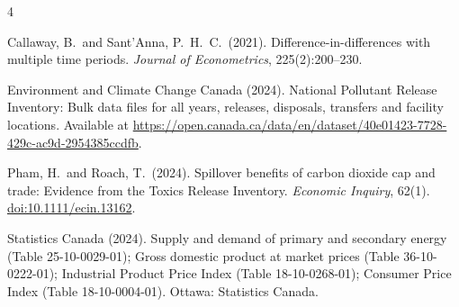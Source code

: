 \documentclass[12pt]{article}
\begin{document}

\begin{thebibliography}{4}

Callaway, B.\ and Sant'Anna, P.\ H.\ C.\ (2021).
\newblock Difference-in-differences with multiple time periods.
\newblock \textit{Journal of Econometrics}, 225(2):200--230.

Environment and Climate Change Canada (2024).
\newblock National Pollutant Release Inventory: Bulk data files for all years,
  releases, disposals, transfers and facility locations.
\newblock Available at \url{https://open.canada.ca/data/en/dataset/40e01423-7728-429c-ac9d-2954385ccdfb}.

Pham, H.\ and Roach, T.\ (2024).
\newblock Spillover benefits of carbon dioxide cap and trade: Evidence from the
  Toxics Release Inventory.
\newblock \textit{Economic Inquiry}, 62(1).
  \href{https://doi.org/10.1111/ecin.13162}{doi:10.1111/ecin.13162}.

Statistics Canada (2024).
\newblock Supply and demand of primary and secondary energy (Table 25-10-0029-01);
  Gross domestic product at market prices (Table 36-10-0222-01);
  Industrial Product Price Index (Table 18-10-0268-01);
  Consumer Price Index (Table 18-10-0004-01).
\newblock Ottawa: Statistics Canada.

\end{thebibliography}
\end{document}
